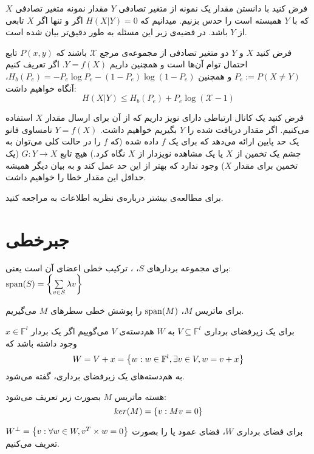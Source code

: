 فرض کنید با دانستن مقدار یک نمونه از متغیر تصادفی
$Y$
مقدار نمونه متغیر تصادفی
$X$
که با
$Y$
همبسته است را حدس بزنیم. میدانیم که
$H(X|Y) = 0$
اگر و تنها اگر
$X$
تابعی از
$Y$
باشد. در قضیه‌ی زیر این مسئله به طور دقیق‌تر بیان شده است.
\begin{theorem}
فرض کنید
$X$ و $Y$
دو متغیر تصادفی از مجموعه‌ی مرجع
$\mathcal{X}$
باشند که
$P(x, y)$
تابع احتمال توام آن‌ها است و همچنین داریم
$Y = f(X)$.
اگر تعریف کنیم
$P_e := P(X \neq Y)$
و همچنین
$H_b(P_e) = - P_e \log P_e - (1 - P_e) \log(1 - P_e)$،
آنگاه خواهیم داشت:
$$H(X|Y) \leq H_b(P_e) + P_e \log(\mathcal{X} - 1)$$
\end{theorem}
\begin{remark}
	فرض کنید یک کانال ارتباطی دارای نویز داریم که از آن برای ارسال مقدار
	$X$
	استفاده می‌کنیم. اگر مقدار دریافت شده را
	$Y$
	بگیریم خواهیم داشت.
	$Y = f(X)$
	 نامساوی فانو یک حد پایین ارائه می‌دهد که برای یک
$f$
داده شده (که
$f$
را در حالت کلی می‌توان به چشم یک تخمین از
$X$
یا یک مشاهده نویزدار از
$X$
نگاه کرد.) هیچ تابع
$G:Y \rightarrow X$
(یک تخمین برای مقدار
$X$)
وجود ندارد که بهتر از این حد عمل کند و به بیان دیگر همیشه حداقل این مقدار خطا را خواهیم داشت.
\end{remark}

	برای مطالعه‌ی بیشتر درباره‌ی نظریه اطلاعات به
\cite{book:info}
مراجعه کنید.
\section{جبرخطی}
\begin{definition}
	برای مجموعه بردار‌های
	$S$، ،
	ترکیب خطی اعضای آن است یعنی:
	$\operatorname{span}(S) = \left\{  \sum\limits_{v \in S} \lambda v \right\}$
	
	برای ماتریس
	$M$، $\operatorname{span}(M)$
را پوشش خطی سطرهای 
$M$
می‌گیریم.
\end{definition}

\begin{definition}[هم‌دسته]
	\label{coset}
	برای یک زیرفضای برداری
	$V \subseteq \mathbb{F}^l$
	به
	$W$
	هم‌دسته‌‌‌ی
	$V$
	می‌گوییم اگر یک بردار
	$x \in \mathbb{F}^l$
	وجود داشته باشد که
	$$W = V + x = \left\{ w: w \in \mathbb{F}^l, \exists v \in V, w = v + x \right\}$$
	به هم‌دسته‌های یک زیرفضای برداری،
	گفته می‌شود.
\end{definition}
\begin{definition}
	هسته ماتریس
	$M$
	بصورت زیر تعریف می‌شود:
	$$ker(M) = \left\{ v: Mv = 0 \right\}$$
\end{definition}
\begin{definition}
برای فضای برداری
$W$،
فضای عمود یا 
 را بصورت
$W^\bot = \left\{ v: \forall w \in W, v^T \times w = 0 \right\}$
تعریف می‌کنیم.
\end{definition}

